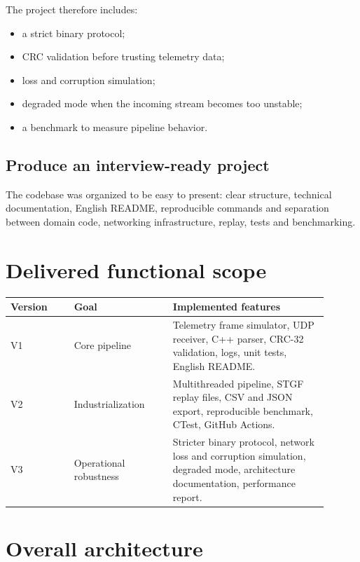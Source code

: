 \documentclass[11pt,a4paper]{article}
\begin{document}
The project therefore includes:

\begin{itemize}[nosep]
    \item a strict binary protocol;
    \item CRC validation before trusting telemetry data;
    \item loss and corruption simulation;
    \item degraded mode when the incoming stream becomes too unstable;
    \item a benchmark to measure pipeline behavior.
\end{itemize}

\subsection{Produce an interview-ready project}

The codebase was organized to be easy to present: clear structure, technical documentation, English README, reproducible commands and separation between domain code, networking infrastructure, replay, tests and benchmarking.

\section{Delivered functional scope}

\begin{longtable}{p{0.18\linewidth} p{0.28\linewidth} p{0.44\linewidth}}
\toprule
\textbf{Version} & \textbf{Goal} & \textbf{Implemented features} \\
\midrule
V1 & Core pipeline & Telemetry frame simulator, UDP receiver, C++ parser, CRC-32 validation, logs, unit tests, English README. \\
\addlinespace
V2 & Industrialization & Multithreaded pipeline, STGF replay files, CSV and JSON export, reproducible benchmark, CTest, GitHub Actions. \\
\addlinespace
V3 & Operational robustness & Stricter binary protocol, network loss and corruption simulation, degraded mode, architecture documentation, performance report. \\
\bottomrule
\end{longtable}

\section{Overall architecture}
\end{document}
